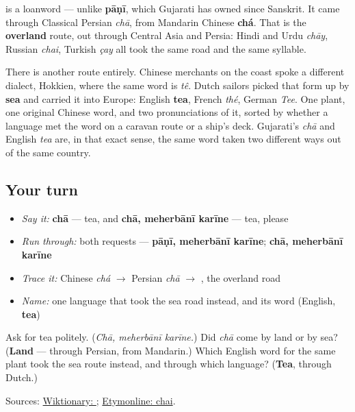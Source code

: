 \begin{cousinweb}
\textbf{} is a loanword — unlike \textbf{pāṇī}, which Gujarati has owned since Sanskrit. It came through Classical Persian \emph{chā}, from Mandarin Chinese \textbf{chá}. That is the \textbf{overland} route, out through Central Asia and Persia: Hindi and Urdu \emph{chāy}, Russian \emph{chai}, Turkish \emph{çay} all took the same road and the same syllable.

There is another route entirely. Chinese merchants on the coast spoke a different dialect, Hokkien, where the same word is \emph{tê}. Dutch sailors picked that form up by \textbf{sea} and carried it into Europe: English \textbf{tea}, French \emph{thé}, German \emph{Tee}. One plant, one original Chinese word, and two pronunciations of it, sorted by whether a language met the word on a caravan route or a ship's deck. Gujarati's \emph{chā} and English \emph{tea} are, in that exact sense, the same word taken two different ways out of the same country.
\end{cousinweb}

\subsection*{Your turn}
\begin{itemize}
\raggedright
  \item \emph{Say it:} \textbf{chā} — tea, and \textbf{chā, meherbānī karīne} — tea, please
  \item \emph{Run through:} both requests — \textbf{pāṇī, meherbānī karīne}; \textbf{chā, meherbānī karīne}
  \item \emph{Trace it:} Chinese \emph{chá} $\to$ Persian \emph{chā} $\to$ \textbf{}, the overland road
  \item \emph{Name:} one language that took the sea road instead, and its word (English, \textbf{tea})
\end{itemize}

\begin{tcolorbox}[breakable,colback=teal!4,colframe=teal!35!black,title={Before you move on}]
Ask for tea politely. (\emph{Chā, meherbānī karīne.}) Did \emph{chā} come by land or by sea? (\textbf{Land} — through Persian, from Mandarin.) Which English word for the same plant took the sea route instead, and through which language? (\textbf{Tea}, through Dutch.)

Sources: \href{https://en.wiktionary.org/wiki/\%E0\%AA\%9A\%E0\%AA\%BE}{Wiktionary: }; \href{https://www.etymonline.com/word/chai}{Etymonline: chai}.
\end{tcolorbox}
